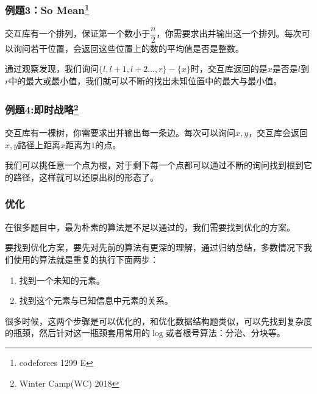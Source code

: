 \documentclass[10pt]{beamer}
\begin{document}
	\begin{frame}
		\frametitle{例题3：So Mean\footnote{codeforces 1299 E}}

		交互库有一个排列，保证第一个数小于$\dfrac n2$，你需要求出并输出这一个排列。每次可以询问若干位置，会返回这些位置上的数的平均值是否是整数。
		
		
		通过观察发现，我们询问$\{l,l+1,l+2\dots,r\}-\{x\}$时，交互库返回的是$x$是否是$l$到$r$中的最大或最小值，我们就可以不断的找出未知位置中的最大与最小值。
		
	\end{frame}
	
	\begin{frame}
		\frametitle{例题4:即时战略\footnote{Winter Camp(WC) 2018}}

		交互库有一棵树，你需要求出并输出每一条边。每次可以询问$x,y$，交互库会返回$x,y$路径上距离$x$距离为$1$的点。
		
		\onslide<2->
		
		我们可以挑任意一个点为根，对于剩下每一个点都可以通过不断的询问找到根到它的路径，这样就可以还原出树的形态了。
	
	\end{frame}
	
	\begin{frame}
		\frametitle{优化}
	
		在很多题目中，最为朴素的算法是不足以通过的，我们需要找到优化的方案。

		要找到优化方案，要先对先前的算法有更深的理解，通过归纳总结，多数情况下我们使用的算法就是重复的执行下面两步：

		\begin{enumerate}
			\item 找到一个未知的元素。
			\item 找到这个元素与已知信息中元素的关系。
		\end{enumerate}

		很多时候，这两个步骤是可以优化的，和优化数据结构题类似，可以先找到复杂度的瓶颈，然后针对这一瓶颈套用常用的$\log$或者根号算法：分治、分块等。

	
	\end{frame}
	
\end{document}
